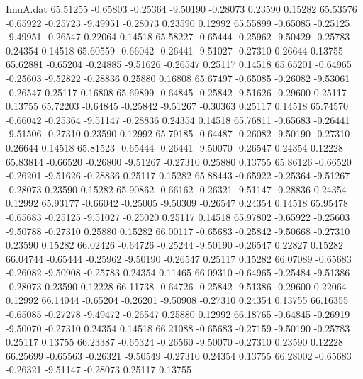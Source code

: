 \begin{filecontents}{ImuA.dat}
  65.51255   -0.65803   -0.25364   -9.50190   -0.28073    0.23590    0.15282
  65.53576   -0.65922   -0.25723   -9.49951   -0.28073    0.23590    0.12992
  65.55899   -0.65085   -0.25125   -9.49951   -0.26547    0.22064    0.14518
  65.58227   -0.65444   -0.25962   -9.50429   -0.25783    0.24354    0.14518
  65.60559   -0.66042   -0.26441   -9.51027   -0.27310    0.26644    0.13755
  65.62881   -0.65204   -0.24885   -9.51626   -0.26547    0.25117    0.14518
  65.65201   -0.64965   -0.25603   -9.52822   -0.28836    0.25880    0.16808
  65.67497   -0.65085   -0.26082   -9.53061   -0.26547    0.25117    0.16808
  65.69899   -0.64845   -0.25842   -9.51626   -0.29600    0.25117    0.13755
  65.72203   -0.64845   -0.25842   -9.51267   -0.30363    0.25117    0.14518
  65.74570   -0.66042   -0.25364   -9.51147   -0.28836    0.24354    0.14518
  65.76811   -0.65683   -0.26441   -9.51506   -0.27310    0.23590    0.12992
  65.79185   -0.64487   -0.26082   -9.50190   -0.27310    0.26644    0.14518
  65.81523   -0.65444   -0.26441   -9.50070   -0.26547    0.24354    0.12228
  65.83814   -0.66520   -0.26800   -9.51267   -0.27310    0.25880    0.13755
  65.86126   -0.66520   -0.26201   -9.51626   -0.28836    0.25117    0.15282
  65.88443   -0.65922   -0.25364   -9.51267   -0.28073    0.23590    0.15282
  65.90862   -0.66162   -0.26321   -9.51147   -0.28836    0.24354    0.12992
  65.93177   -0.66042   -0.25005   -9.50309   -0.26547    0.24354    0.14518
  65.95478   -0.65683   -0.25125   -9.51027   -0.25020    0.25117    0.14518
  65.97802   -0.65922   -0.25603   -9.50788   -0.27310    0.25880    0.15282
  66.00117   -0.65683   -0.25842   -9.50668   -0.27310    0.23590    0.15282
  66.02426   -0.64726   -0.25244   -9.50190   -0.26547    0.22827    0.15282
  66.04744   -0.65444   -0.25962   -9.50190   -0.26547    0.25117    0.15282
  66.07089   -0.65683   -0.26082   -9.50908   -0.25783    0.24354    0.11465
  66.09310   -0.64965   -0.25484   -9.51386   -0.28073    0.23590    0.12228
  66.11738   -0.64726   -0.25842   -9.51386   -0.29600    0.22064    0.12992
  66.14044   -0.65204   -0.26201   -9.50908   -0.27310    0.24354    0.13755
  66.16355   -0.65085   -0.27278   -9.49472   -0.26547    0.25880    0.12992
  66.18765   -0.64845   -0.26919   -9.50070   -0.27310    0.24354    0.14518
  66.21088   -0.65683   -0.27159   -9.50190   -0.25783    0.25117    0.13755
  66.23387   -0.65324   -0.26560   -9.50070   -0.27310    0.23590    0.12228
  66.25699   -0.65563   -0.26321   -9.50549   -0.27310    0.24354    0.13755
  66.28002   -0.65683   -0.26321   -9.51147   -0.28073    0.25117    0.13755

\end{filecontents}
